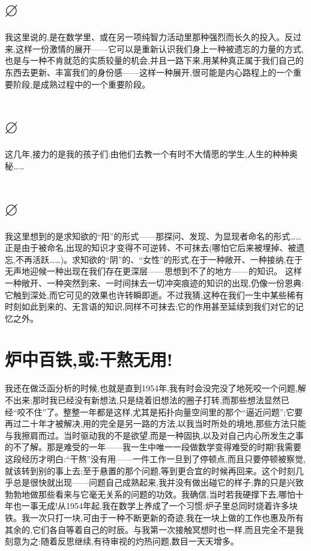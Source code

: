 \section{$\varnothing$}

我这里说的,是在数学里、或在另一项纯智力活动里那种强烈而长久的投入。反过来,这样一份激情的展开——它可以是重新认识我们身上一种被遗忘的力量的方式,也是与一种不肯就范的实质较量的机会,并且一路下来,用某种真正属于我们自己的东西去更新、丰富我们的身份感——这样一种展开,很可能是内心路程上的一个重要阶段,是成熟过程中的一个重要阶段。

\section{$\varnothing$}

这几年,接力的是我的孩子们:由他们去教一个有时不大情愿的学生,人生的种种奥秘……

\section{$\varnothing$}

我这里想到的是求知欲的“阳”的形式——那探问、发现、为显现者命名的形式……正是由于被命名,出现的知识才变得不可逆转、不可抹去(哪怕它后来被埋掉、被遗忘,不再活跃……)。求知欲的“阴”的、“女性”的形式,在于一种敞开、一种接纳,在于无声地迎候一种出现在我们存在更深层——思想到不了的地方——的知识。
这样一种敞开、一种突然到来、一时间抹去一切冲突痕迹的知识的出现,仍像一份恩典:它触到深处,而它可见的效果也许转瞬即逝。不过我猜,这种在我们一生中某些稀有时刻如此到来的、无言语的知识,同样不可抹去;它的作用甚至延续到我们对它的记忆之外。

\section{炉中百铁,或:干熬无用!}

我还在做泛函分析的时候,也就是直到1954年,我有时会没完没了地死咬一个问题,解不出来;那时我已经没有新想法,只是绕着旧想法的圈子打转,而那些想法显然已经“咬不住”了。整整一年都是这样,尤其是拓扑向量空间里的那个“逼近问题”;它要再过二十年才被解决,用的完全是另一路的方法,以我当时所处的境地,那些方法只能与我擦肩而过。当时驱动我的不是欲望,而是一种固执,以及对自己内心所发生之事的不了解。那是难受的一年——我一生中唯一一段做数学变得难受的时期!我需要这段经历才明白:“干熬”没有用——一件工作一旦到了停顿点,而且只要停顿被察觉,就该转到别的事上去;至于悬置的那个问题,等到更合宜的时候再回来。这个时刻几乎总是很快就出现——问题自己成熟起来,我并没有做出碰它的样子;靠的只是兴致勃勃地做那些看来与它毫无关系的问题的功效。我确信,当时若我硬撑下去,哪怕十年也一事无成!从1954年起,我在数学上养成了一个习惯:炉子里总同时烧着许多块铁。我一次只打一块,可由于一种不断更新的奇迹,我在一块上做的工作也惠及所有其余的,它们各自等着自己的时辰。与我第一次接触冥想时也一样,而且完全不是我刻意为之:随着反思继续,有待审视的灼热问题,数目一天天增多。

